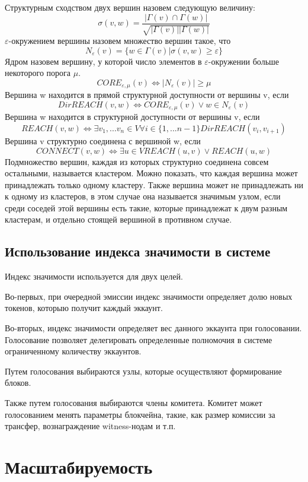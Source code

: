 \documentclass[a4paper,12pt]{article}
\begin{document}
Структурным сходством двух вершин назовем следующую величину:
$$
\sigma(v,w)=\frac{ |\Gamma(v) \cap \Gamma(w)|}{\sqrt{|\Gamma(v)||\Gamma(w)|}}
$$
$\varepsilon$-окружением вершины назовем множество вершин такое, что
$$
N_{\varepsilon}(v) = \{ w \in \Gamma(v) | \sigma(v,w) \ge \varepsilon \}
$$
Ядром назовем вершину, у которой число элементов в $\varepsilon$-окружении больше некоторого порога $\mu$.
$$
CORE_{\varepsilon,\mu}(v) \Leftrightarrow |N_{\varepsilon} (v)| \ge \mu
$$
Вершина w находится в прямой структурной доступности от вершины v, если
$$
DirREACH(v,w) \Leftrightarrow CORE_{\varepsilon,\mu}(v) \vee w \in N_{\varepsilon}(v)
$$
Вершина w находится в структурной доступности от вершины v, если
$$
REACH(v,w) \Leftrightarrow \exists v_1,...v_n \in V \forall i \in \{1,...n-1\}DirREACH(v_i,v_{i+1})
$$
Вершина v структурно соединена с вершиной w, если
$$
CONNECT(v,w) \Leftrightarrow \exists u \in V REACH(u,v) \vee REACH(u,w)
$$
Подмножество вершин, каждая из которых структурно соединена совсем остальными, называется кластером. Можно показать, что каждая вершина может принадлежать только одному кластеру. Также вершина может не принадлежать ни к одному из кластеров, в этом случае она называется значимым узлом, если среди соседей этой вершины есть такие, которые принадлежат к двум разным кластерам, и отдельно стоящей вершиной в противном случае.

\subsection{Использование индекса значимости в системе}
Индекс значимости используется для двух целей. 

Во-первых, при очередной эмиссии индекс значимости определяет долю новых токенов, которыю получит каждый эккаунт.

Во-вторых, индекс значимости определяет вес данного эккаунта при голосовании. Голосование позволяет делегировать определенные полномочия в системе ограниченному количеству эккаунтов.

Путем голосования выбираются узлы, которые осуществляют формирование блоков. 

Также путем голосования выбираются члены комитета. Комитет может голосованием менять параметры блокчейна, такие, как размер комиссии за трансфер, вознаграждение witness-нодам и т.п.


\section{Масштабируемость}
\end{document}
